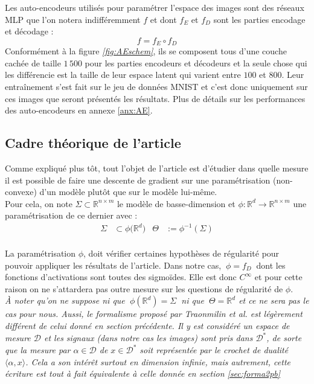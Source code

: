 \documentclass[hidelinks, french]{article} %
\newcommand{\R}{\mathbb{R}}
\newcommand{\lr}{\longrightarrow}
\newcommand{\etal}{\textit{et al. }}
\theoremstyle{enonce}
\theoremstyle{special}
\theoremstyle{rq}
\theoremstyle{exo}
\theoremstyle{demo}
\begin{document}
Les auto-encodeurs utilisés pour paramétrer l'espace des images sont des réseaux MLP que l'on notera indifféremment $f$ et dont $f_E$ et $f_D$ sont les parties encodage et décodage :
\[f = f_E\circ f_D\]
Conformément à la figure \textit{\ref{fig:AEschem}}, ils se composent tous d'une couche cachée de taille $1\,500$ pour les parties encodeurs et décodeurs et la seule chose qui les différencie est la taille de leur espace latent qui varient entre $100$ et $800$. Leur entraînement s'est fait sur le jeu de données MNIST et c'est donc uniquement sur ces images que seront présentés les résultats. Plus de détails sur les performances des auto-encodeurs en annexe \ref{anx:AE}.
\\




\subsection{Cadre théorique de l'article}\label{sec:article1/2}

Comme expliqué plus tôt, tout l'objet de l'article \cite{traonmilin_basins_2022} est d'étudier dans quelle mesure il est possible de faire une descente de gradient sur une paramétrisation (non-convexe) d'un modèle plutôt que sur le modèle lui-même.
\\
Pour cela, on note $\Sigma\subset\R^{n\times m}$ le modèle de basse-dimension et $\phi: \R^d\lr\R^{n\times m}$ une paramétrisation de ce dernier avec :
\begin{align*}\Sigma&\subset\phi\big(\R^d\big)  &  \Theta&:=\phi^{-1}(\Sigma)\end{align*}
\\
La paramétrisation $\phi$, doit vérifier certaines hypothèses de régularité pour pouvoir appliquer les résultats de l'article. Dans notre cas, $\ \phi=f_D\ $ dont les fonctions d'activations sont toutes des sigmoïdes. Elle est donc $C^{\infty}$ et pour cette raison on ne s'attardera pas outre mesure sur les questions de régularité de $\phi$.
\\

\textit{\`A noter qu'on ne suppose ni que $\ \phi(\R^d)=\Sigma\ $ ni que  $\ \Theta=\R^d$ et ce ne sera pas le cas pour nous. Aussi, le formalisme proposé par Traonmilin \etal est légèrement différent de celui donné en section précédente. Il y est considéré un espace de mesure $\mathcal{D}$ et les signaux (dans notre cas les images) sont pris dans $\mathcal{D}^*$, de sorte que la mesure par $\alpha\in\mathcal{D}$ de $x\in\mathcal{D}^*$ soit représentée par le crochet de dualité $\langle \alpha,x\rangle$. Cela a son intérêt surtout en dimension infinie, mais autrement, cette écriture est tout à fait équivalente à celle donnée en section \ref{sec:forma2pb}}
\\
\end{document}
